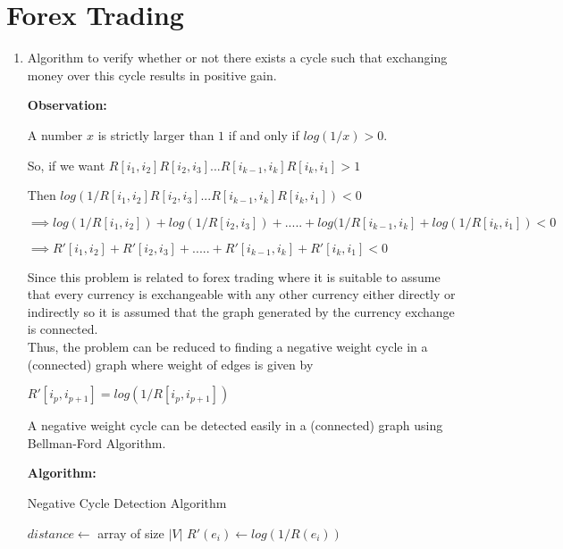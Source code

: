\documentclass[a4paper]{article}
\begin{document}
\section{Forex Trading}
\begin{enumerate}[1.]
    \item Algorithm to verify whether or not there exists a cycle such that exchanging money over this cycle results in positive gain.
    
    \textbf{Observation:}
    
    A number $x$ is strictly larger than $1$ if and only if $log(1/x) > 0$.
    
    \begin{center}
        So, if we want ${R[i_1,i_2]R[i_2,i_3]...R[i_{k-1},i_k]R[i_k,i_1] > 1}$

        Then ${log(1/R[i_1,i_2]R[i_2,i_3]...R[i_{k-1},i_k]R[i_k,i_1]) < 0}$
        
        $\implies log(1/R[i_1,i_2]) + log(1/R[i_2,i_3]) + ..... + log(1/R[i_{k-1},i_k] + log(1/R[i_k,i_1]) < 0$
        
        $\implies R'[i_1,i_2] + R'[i_2,i_3] + ..... + R'[i_{k-1},i_k] + R'[i_k,i_1] < 0$
    \end{center}
    Since this problem is related to forex trading where it is suitable to assume that every currency is exchangeable with any other currency either directly or indirectly so it is assumed that the graph generated by the currency exchange is connected.  \\
    Thus, the problem can be reduced to finding a negative weight cycle in a (connected) graph where weight of edges is given by
    \begin{center}
        $R'[i_p,i_{p+1}] = log(1/R[i_p,i_{p+1}])$
    \end{center}
    A negative weight cycle can be detected easily in a (connected) graph using Bellman-Ford Algorithm.
    
    \textbf{Algorithm:}
    
    {\centering
    \begin{minipage}{\linewidth}
    \begin{algorithm}[H]
    \caption{Negative Cycle Detection Algorithm}\label{alg:dc}
    \begin{algorithmic}[1]
    
    
    \State $distance \gets$ array of size $|V|$
     
        \State $R'(e_i) \gets log(1/R(e_i))$
    \EndFor
    

\end{algorithmic}
\end{algorithm}
\end{minipage}}
\end{enumerate}
\end{document}

